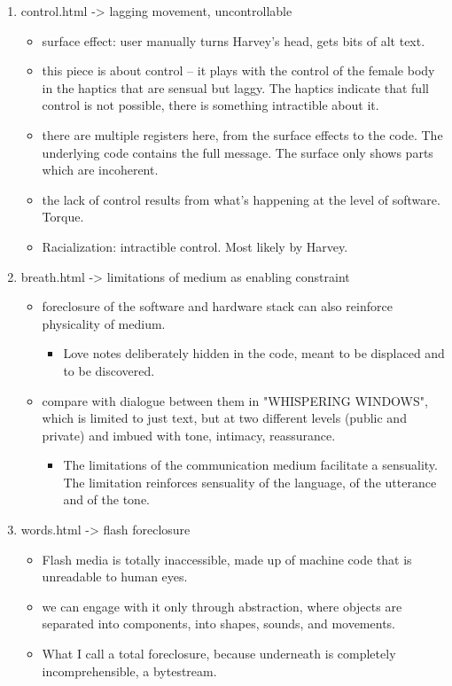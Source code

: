 \documentclass[11pt]{article}
\begin{document}
\begin{enumerate}
\begin{enumerate}
\item control.html -> lagging movement, uncontrollable
\label{sec:orga3309a8}
\begin{itemize}
\item surface effect: user manually turns Harvey's head, gets bits of alt
text.
\item this piece is about control -- it plays with the control of the
female body in the haptics that are sensual but laggy. The haptics
indicate that full control is not possible, there is something
intractible about it.
\item there are multiple registers here, from the surface effects to the
code. The underlying code contains the full message. The surface
only shows parts which are incoherent.
\item the lack of control results from what's happening at the level of
software. Torque.
\item Racialization: intractible control. Most likely by Harvey.
\end{itemize}

\item breath.html -> limitations of medium as enabling constraint
\label{sec:org5086ab1}
\begin{itemize}
\item foreclosure of the software and hardware stack can also reinforce
physicality of medium.
\begin{itemize}
\item Love notes deliberately hidden in the code, meant to be displaced
and to be discovered.
\end{itemize}
\item compare with dialogue between them in "WHISPERING WINDOWS", which is
limited to just text, but at two different levels (public and
private) and imbued with tone, intimacy, reassurance. 
\begin{itemize}
\item The limitations of the communication medium facilitate a
sensuality. The limitation reinforces sensuality of the language,
of the utterance and of the tone.
\end{itemize}
\end{itemize}

\item words.html -> flash foreclosure
\label{sec:orgf1b678d}
\begin{itemize}
\item Flash media is totally inaccessible, made up of machine code that is
unreadable to human eyes.
\item we can engage with it only through abstraction, where objects are
separated into components, into shapes, sounds, and movements.
\item What I call a total foreclosure, because underneath is completely
incomprehensible, a bytestream.
\end{itemize}


\end{enumerate}
\end{enumerate}
\end{document}
